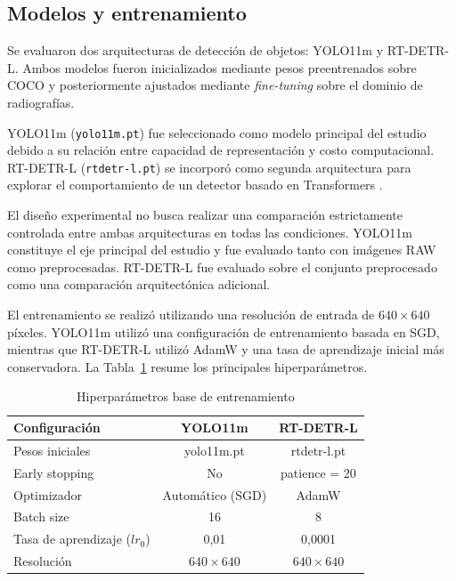 \documentclass[conference]{IEEEtran}
\begin{document}
\subsection{Modelos y entrenamiento}

Se evaluaron dos arquitecturas de detección de objetos: YOLO11m y RT-DETR-L. Ambos modelos fueron inicializados mediante pesos preentrenados sobre COCO y posteriormente ajustados mediante \textit{fine-tuning} sobre el dominio de radiografías.

YOLO11m (\texttt{yolo11m.pt}) fue seleccionado como modelo principal del estudio debido a su relación entre capacidad de representación y costo computacional. RT-DETR-L (\texttt{rtdetr-l.pt}) se incorporó como segunda arquitectura para explorar el comportamiento de un detector basado en Transformers \cite{b7_leng}.

El diseño experimental no busca realizar una comparación estrictamente controlada entre ambas arquitecturas en todas las condiciones. YOLO11m constituye el eje principal del estudio y fue evaluado tanto con imágenes RAW como preprocesadas. RT-DETR-L fue evaluado sobre el conjunto preprocesado como una comparación arquitectónica adicional.

El entrenamiento se realizó utilizando una resolución de entrada de $640\times640$ píxeles. YOLO11m utilizó una configuración de entrenamiento basada en SGD, mientras que RT-DETR-L utilizó AdamW y una tasa de aprendizaje inicial más conservadora. La Tabla~\ref{tab:hparams} resume los principales hiperparámetros.

\begin{table}[htbp]
\caption{Hiperparámetros base de entrenamiento}
\label{tab:hparams}
\begin{center}
\begin{tabular}{lcc}
\toprule
\textbf{Configuración} & \textbf{YOLO11m} & \textbf{RT-DETR-L} \\
\midrule
Pesos iniciales & yolo11m.pt & rtdetr-l.pt \\
Early stopping & No & patience = 20 \\
Optimizador & Automático (SGD) & AdamW \\
Batch size & 16 & 8 \\
Tasa de aprendizaje ($lr_0$) & 0,01 & 0,0001 \\
Resolución & $640\times640$ & $640\times640$ \\
\bottomrule
\end{tabular}
\end{center}
\end{table}
\end{document}
